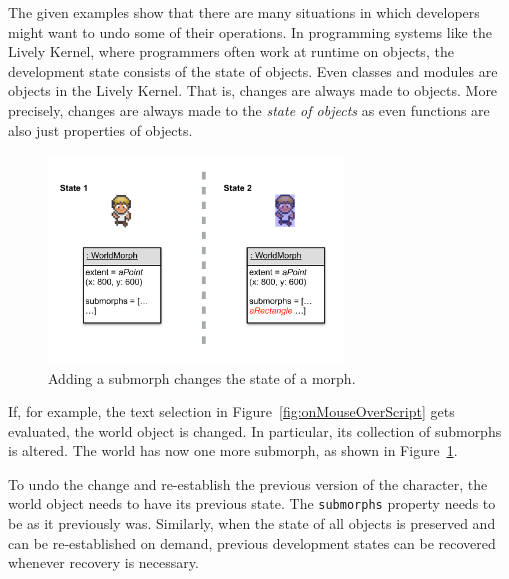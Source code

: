 The given examples show that there are many situations in which developers might want to undo some of their operations.
In programming systems like the Lively Kernel, where programmers often work at runtime on objects, the development state consists of the state of objects.
Even classes and modules are objects in the Lively Kernel.
That is, changes are always made to objects.
More precisely, changes are always made to the \emph{state of objects} as even functions are also just properties of objects.

\begin{figure}[h]
    \centering
    \includegraphics[width=0.7\textwidth]{figures/3_motivation/5_stateChanges.pdf}
    \caption{Adding a submorph changes the state of a morph.}
    \label{fig:changedCharacter}
\end{figure}

If, for example, the text selection in Figure~\ref{fig:onMouseOverScript} gets evaluated, the world object is changed.
In particular, its collection of submorphs is altered.
The world has now one more submorph, as shown in Figure~\ref{fig:changedCharacter}.

To undo the change and re-establish the previous version of the character, the world object needs to have its previous state.
The \lstinline{submorphs} property needs to be as it previously was.
Similarly, when the state of all objects is preserved and can be re-established on demand, previous development states can be recovered whenever recovery is necessary.
